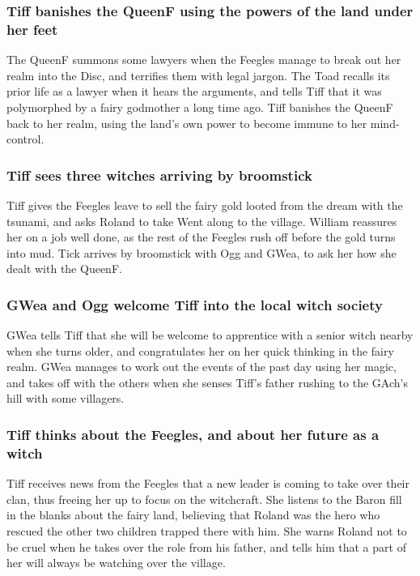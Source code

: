 \subsubsection{\Gls{Tiff} banishes the \Gls{QueenF} using the powers of the land under her feet}
The \Gls{QueenF} summons some lawyers when the Feegles manage to break out her realm into the
Disc, and terrifies them with legal jargon. The \Gls{Toad} recalls its prior life as a lawyer when
it hears the arguments, and tells \Gls{Tiff} that it was polymorphed by a fairy godmother a long
time ago. \Gls{Tiff} banishes the \Gls{QueenF} back to her realm, using the land's own power to
become immune to her mind-control.

\subsubsection{\Gls{Tiff} sees three witches arriving by broomstick}
\Gls{Tiff} gives the Feegles leave to sell the fairy gold looted from the dream with the tsunami,
and asks \Gls{Roland} to take \Gls{Went} along to the village. \Gls{William} reassures her on a
job well done, as the rest of the Feegles rush off before the gold turns into mud. \Gls{Tick}
arrives by broomstick with \Gls{Ogg} and \Gls{GWea}, to ask her how she dealt with the \Gls{QueenF}.

\subsubsection{\Gls{GWea} and \Gls{Ogg} welcome \Gls{Tiff} into the local witch society}
\Gls{GWea} tells \Gls{Tiff} that she will be welcome to apprentice with a senior witch nearby when
she turns older, and congratulates her on her quick thinking in the fairy realm. \Gls{GWea} manages
to work out the events of the past day using her magic, and takes off with the others when she
senses \Gls{Tiff}'s father rushing to the \Gls{GAch}'s hill with some villagers.

\subsubsection{\Gls{Tiff} thinks about the Feegles, and about her future as a witch}
\Gls{Tiff} receives news from the Feegles that a new leader is coming to take over their clan, thus
freeing her up to focus on the witchcraft. She listens to the \Gls{Baron} fill in the blanks about
the fairy land, believing that \Gls{Roland} was the hero who rescued the other two children trapped
there with him. She warns \Gls{Roland} not to be cruel when he takes over the role from his father,
and tells him that a part of her will always be watching over the village.